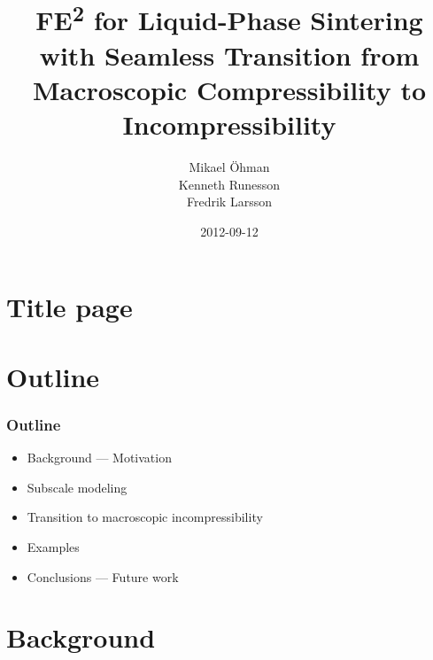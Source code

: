 \documentclass[11pt]{beamer} %
\title{FE\textsuperscript{2} for Liquid-Phase Sintering with Seamless Transition from Macroscopic Compressibility to Incompressibility}
\author[Mikael \"Ohman]{Mikael \"Ohman\\Kenneth Runesson\\Fredrik Larsson}
\institute{Department of Applied Mechanics\\ Chalmers University of Technology}
\date{2012-09-12}
\begin{document}
\section{Title page}
\begin{frame}[plain]
 \titlepage
\end{frame}

\section{Outline}
\begin{frame}
 \frametitle{Outline}

\begin{itemize}
 \item Background --- Motivation
 \item Subscale modeling
 \item Transition to macroscopic incompressibility
 \item Examples
 \item Conclusions --- Future work
\end{itemize}
\end{frame}

\section{Background}
\end{document}
